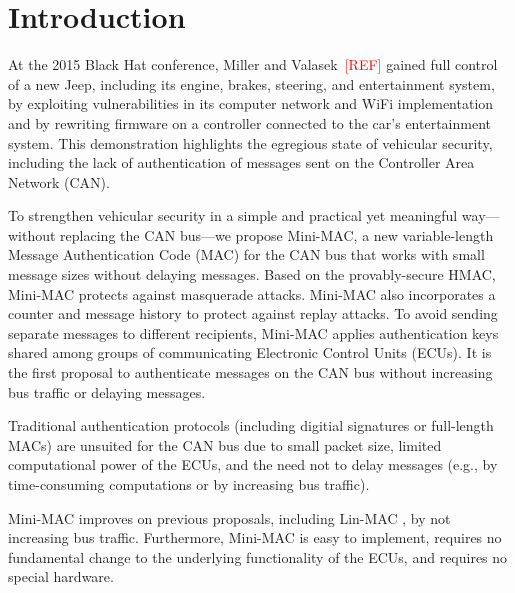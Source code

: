 \section{Introduction}

At the 2015 Black Hat conference, Miller and Valasek~\textcolor{red}{[REF]} gained full control of a new Jeep,
including its engine, brakes, steering, and entertainment system, by exploiting vulnerabilities in its
computer network and WiFi implementation and by rewriting firmware on a controller connected to the car's entertainment system.
This demonstration highlights the egregious state of vehicular security, including the lack of 
authentication of messages sent on the Controller Area Network (CAN).   



To strengthen vehicular security in a simple and practical 
yet meaningful way---without replacing the CAN bus---we propose Mini-MAC, 
a new variable-length Message Authentication Code (MAC)
for the CAN bus that works with small message sizes without delaying messages.  
Based on the provably-secure HMAC, Mini-MAC protects against masquerade attacks.  
Mini-MAC also incorporates a counter and message history to protect against replay attacks.
To avoid sending separate messages to different recipients, Mini-MAC applies authentication keys
shared among groups of communicating Electronic Control Units (ECUs).
It is the first proposal to authenticate messages on the CAN bus without increasing bus traffic
or delaying messages. 

Traditional authentication protocols (including digitial signatures or full-length MACs) are unsuited for the CAN bus due to
small packet size, limited computational power of the ECUs,
and the need not to delay messages (e.g., by time-consuming computations or by
increasing bus traffic).   

Mini-MAC improves on previous proposals, including Lin-MAC \cite{Lin-MAC}, by not increasing bus traffic.
Furthermore, Mini-MAC is easy to implement,
requires no fundamental change to the underlying functionality of the ECUs, and 
requires no special hardware.


